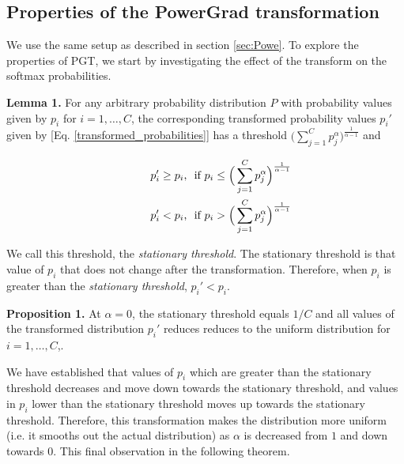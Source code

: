 \documentclass[runningheads]{llncs}
\begin{document}
\subsection{Properties of the PowerGrad transformation}
\label{sec:pgt_prop}

We use the same setup as described in section \ref{sec:Powe}. To explore the properties
of PGT, we start by investigating the effect of the transform on the softmax
probabilities.

\textbf{Lemma 1.} For any arbitrary probability distribution $P$ with probability values
given by $p_i$ for $i=1,\dots,C$, the corresponding transformed probability values
$p_i'$ given by [Eq. \ref{transformed_probabilities}] has a threshold $\Big(\sum
_{j=1}^C p_j^{\alpha}\Big)^{\frac{1}{\alpha-1}}$ and

\vspace{-0.5cm}
\begin{equation} \begin{split} p_i' \geq p_i & \text{,\ \ if } p_i \leq
\Big(\sum _{j=1}^C p_j^{\alpha }\Big)^{\frac{1}{\alpha-1}} \\ \hspace*{1cm}
p_i' < p_i & \text{,\ \ if } p_i > \Big(\sum _{j=1}^C
p_j^{\alpha}\Big)^{\frac{1}{\alpha-1}} \end{split} \label{eqn:threshold0}
\end{equation}

\vspace{-0.2cm}
We call this threshold, the \textit{stationary threshold}. The stationary threshold is
that value of $p_i$ that does not change after the transformation. Therefore, when $p_i$
is greater than the \textit{stationary threshold}, $p_i' < p_i$.



\textbf{Proposition 1.} At $\alpha=0$, the stationary threshold equals $1/C$ and all
values of the transformed distribution $p_i'$ reduces reduces to the uniform
distribution for $i=1,\dots,C$,.

We have established that values of $p_i$ which are greater than the stationary threshold
decreases and move down towards the stationary threshold, and values in $p_i$ lower than
the stationary threshold moves up towards the stationary threshold. Therefore, this
transformation makes the distribution more uniform (i.e. it smooths out the actual
distribution) as $\alpha$ is decreased from $1$ and down towards $0$. This final
observation in the following theorem.
\end{document}
